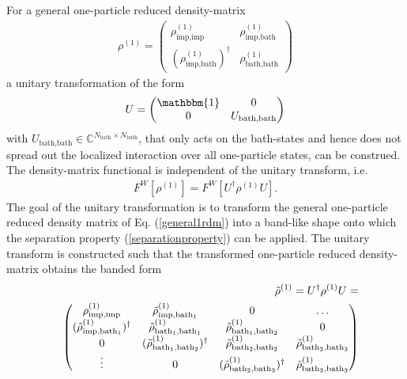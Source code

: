 \documentclass[%
 reprint,
nofootinbib,
 amsmath,amssymb,
 aps,
]{revtex4-2}
\begin{document}
For a general one-particle reduced density-matrix 
\begin{eqnarray}
\rho^{(1)}=\begin{pmatrix}
\rho^{(1)}_{\text{imp,imp}} & \rho^{(1)}_{\text{imp,bath}} \\
(\rho^{(1)}_{\text{imp,bath}})^\dagger & \rho^{(1)}_{\text{bath,bath}}
\end{pmatrix} \label{general1rdm}
\end{eqnarray}
a unitary transformation of the form 
\begin{eqnarray}
U=\begin{pmatrix}
\mathbbm{1} & 0 \\
0 & U_{\text{bath,bath}}
\end{pmatrix}
\end{eqnarray}
with $U_{\text{bath,bath}}\in\mathbb{C}^{N_{\text{bath}}\times N_{\text{bath}}}$, that only acts on the bath-states and hence does not spread out the localized interaction over all one-particle states, can be construed. The density-matrix functional is independent of the unitary transform, i.e. 
\begin{eqnarray}
F^W[\rho^{(1)}] = F^W[U^\dagger\rho^{(1)}U].
\end{eqnarray}
The goal of the unitary transformation is to transform the general one-particle reduced density matrix of Eq. (\ref{general1rdm}) into a band-like shape onto which the separation property (\ref{separationproperty}) can be applied. 
\break
The unitary transform is constructed such that the transformed one-particle reduced density-matrix obtains the banded form
\begin{eqnarray}
&&\Tilde{\rho}^{(1)}=U^\dagger\rho^{(1)}U = \\
&&\begin{pmatrix}
\rho^{(1)}_{\text{imp,imp}} & \Tilde{\rho}^{(1)}_{\text{imp,bath$_1$}} & 0  & \dots\\
(\Tilde{\rho}^{(1)}_{\text{imp,bath$_1$}})^\dagger & \Tilde{\rho}^{(1)}_{\text{bath$_1$,bath$_1$}} & \Tilde{\rho}^{(1)}_{\text{bath$_1$,bath$_2$}} & 0\\
0 & (\Tilde{\rho}^{(1)}_{\text{bath$_1$,bath$_2$}})^\dagger & \Tilde{\rho}^{(1)}_{\text{bath$_2$,bath$_2$}} & \Tilde{\rho}^{(1)}_{\text{bath$_2$,bath$_3$}} \\
\vdots & 0 & (\Tilde{\rho}^{(1)}_{\text{bath$_2$,bath$_3$}})^\dagger & \Tilde{\rho}^{(1)}_{\text{bath$_3$,bath$_3$}}
\end{pmatrix} \nonumber\\
\end{eqnarray}
\end{document}
